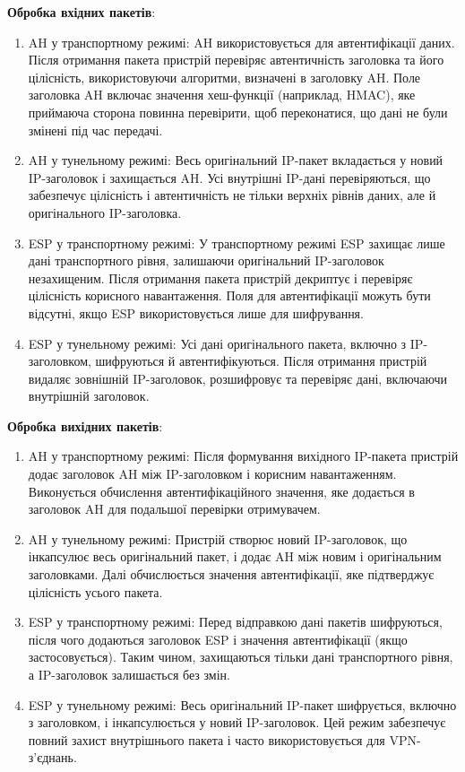 \textbf{Обробка вхідних пакетів}:
\begin{enumerate}
    \item AH у транспортному режимі:
    AH використовується для автентифікації даних. Після отримання пакета пристрій перевіряє автентичність заголовка та його цілісність, використовуючи алгоритми, визначені в заголовку AH.
    Поле заголовка AH включає значення хеш-функції (наприклад, HMAC), яке приймаюча сторона повинна перевірити, щоб переконатися, що дані не були змінені під час передачі.
    \item AH у тунельному режимі:
    Весь оригінальний IP-пакет вкладається у новий IP-заголовок і захищається AH. Усі внутрішні IP-дані перевіряються, що забезпечує цілісність і автентичність не тільки верхніх рівнів даних, але й оригінального IP-заголовка.
    \item ESP у транспортному режимі:
    У транспортному режимі ESP захищає лише дані транспортного рівня, залишаючи оригінальний IP-заголовок незахищеним. Після отримання пакета пристрій декриптує і перевіряє цілісність корисного навантаження.
    Поля для автентифікації можуть бути відсутні, якщо ESP використовується лише для шифрування.
    \item ESP у тунельному режимі:
    Усі дані оригінального пакета, включно з IP-заголовком, шифруються й автентифікуються. Після отримання пристрій видаляє зовнішній IP-заголовок, розшифровує та перевіряє дані, включаючи внутрішній заголовок.
\end{enumerate}

\textbf{Обробка вихідних пакетів}:
\begin{enumerate}
    \item AH у транспортному режимі:
    Після формування вихідного IP-пакета пристрій додає заголовок AH між IP-заголовком і корисним навантаженням. Виконується обчислення автентифікаційного значення, яке додається в заголовок AH для подальшої перевірки отримувачем.
    \item AH у тунельному режимі:
    Пристрій створює новий IP-заголовок, що інкапсулює весь оригінальний пакет, і додає AH між новим і оригінальним заголовками. Далі обчислюється значення автентифікації, яке підтверджує цілісність усього пакета.
    \item ESP у транспортному режимі:
    Перед відправкою дані пакетів шифруються, після чого додаються заголовок ESP і значення автентифікації (якщо застосовується). Таким чином, захищаються тільки дані транспортного рівня, а IP-заголовок залишається без змін.
    \item ESP у тунельному режимі:
    Весь оригінальний IP-пакет шифрується, включно з заголовком, і інкапсулюється у новий IP-заголовок. Цей режим забезпечує повний захист внутрішнього пакета і часто використовується для VPN-з’єднань.
\end{enumerate}

